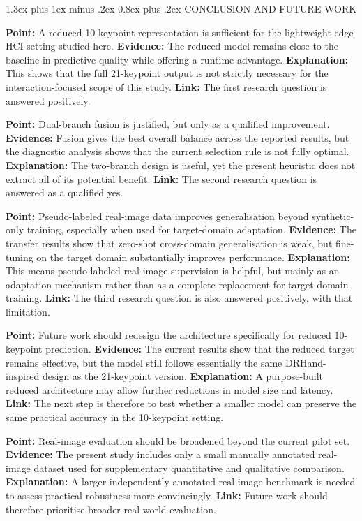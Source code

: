 \documentclass[10pt,letterpaper]{article}
\makeatletter
\renewcommand\section{\@startsection{section}{1}{\z@}%
  {1.3ex plus 1ex minus .2ex}%
  {0.8ex plus .2ex}%
  {\centering\normalfont\small\scshape}}
\makeatother
\begin{document}
\section{CONCLUSION AND FUTURE WORK}

\noindent\textbf{Point:} A reduced 10-keypoint representation is sufficient for the lightweight edge-HCI setting studied here.
\textbf{Evidence:} The reduced model remains close to the baseline in predictive quality while offering a runtime advantage.
\textbf{Explanation:} This shows that the full 21-keypoint output is not strictly necessary for the interaction-focused scope of this study.
\textbf{Link:} The first research question is answered positively.

\medskip
\noindent\textbf{Point:} Dual-branch fusion is justified, but only as a qualified improvement.
\textbf{Evidence:} Fusion gives the best overall balance across the reported results, but the diagnostic analysis shows that the current selection rule is not fully optimal.
\textbf{Explanation:} The two-branch design is useful, yet the present heuristic does not extract all of its potential benefit.
\textbf{Link:} The second research question is answered as a qualified yes.

\medskip
\noindent\textbf{Point:} Pseudo-labeled real-image data improves generalisation beyond synthetic-only training, especially when used for target-domain adaptation.
\textbf{Evidence:} The transfer results show that zero-shot cross-domain generalisation is weak, but fine-tuning on the target domain substantially improves performance.
\textbf{Explanation:} This means pseudo-labeled real-image supervision is helpful, but mainly as an adaptation mechanism rather than as a complete replacement for target-domain training.
\textbf{Link:} The third research question is also answered positively, with that limitation.

\medskip
\noindent\textbf{Point:} Future work should redesign the architecture specifically for reduced 10-keypoint prediction.
\textbf{Evidence:} The current results show that the reduced target remains effective, but the model still follows essentially the same DRHand-inspired design as the 21-keypoint version.
\textbf{Explanation:} A purpose-built reduced architecture may allow further reductions in model size and latency.
\textbf{Link:} The next step is therefore to test whether a smaller model can preserve the same practical accuracy in the 10-keypoint setting.

\medskip
\noindent\textbf{Point:} Real-image evaluation should be broadened beyond the current pilot set.
\textbf{Evidence:} The present study includes only a small manually annotated real-image dataset used for supplementary quantitative and qualitative comparison.
\textbf{Explanation:} A larger independently annotated real-image benchmark is needed to assess practical robustness more convincingly.
\textbf{Link:} Future work should therefore prioritise broader real-world evaluation.
\end{document}
